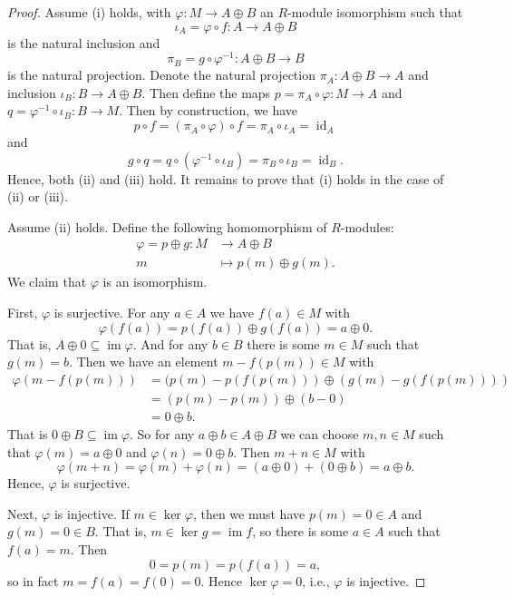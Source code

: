 \documentclass[12pt]{article}
\theoremstyle{definition}
\renewcommand{\phi}{\varphi}
\newcommand{\<}{\langle}
\renewcommand{\>}{\rangle}
\newcommand{\seq}{\subseteq}
\DeclareMathOperator{\id}{id}
\DeclareMathOperator{\im}{im}
\begin{document}
\begin{proof}
    Assume (i) holds, with $\phi : M \to A \oplus B$ an $R$-module isomorphism such that
    \[
        \iota_A = \phi \circ f: A \longrightarrow A \oplus B
    \]
    is the natural inclusion and
    \[
        \pi_B = g \circ \phi^{-1}: A \oplus B \longrightarrow B
    \]
    is the natural projection.
    Denote the natural projection $\pi_A : A \oplus B \to A$ and inclusion $\iota_B : B \to A \oplus B$.
    Then define the maps $p = \pi_A \circ \phi : M \to A$ and $q = \phi^{-1} \circ \iota_B : B \to M$.
    Then by construction, we have
    \[
        p \circ f
            = (\pi_A \circ \phi) \circ f
            = \pi_A \circ \iota_A
            = \id_A
    \]
    and
    \[
        g \circ q
            = q \circ (\phi^{-1} \circ \iota_B)
            = \pi_B \circ \iota_B
            = \id_B.
    \]
    Hence, both (ii) and (iii) hold.
    It remains to prove that (i) holds in the case of (ii) or (iii).

    Assume (ii) holds.
    Define the following homomorphism of $R$-modules:
    \begin{align*}
        \phi = p \oplus g: M &\longrightarrow A \oplus B \\
            m &\longmapsto p(m) \oplus g(m).
    \end{align*}
    We claim that $\phi$ is an isomorphism.
    
    First, $\phi$ is surjective.
    For any $a \in A$ we have $f(a) \in M$ with
    \[
        \phi(f(a)) = p(f(a)) \oplus g(f(a)) = a \oplus 0.
    \]
    That is, $A \oplus 0 \seq \im \phi$.
    And for any $b \in B$ there is some $m \in M$ such that $g(m) = b$.
    Then we have an element $m - f(p(m)) \in M$ with
    \begin{align*}
        \phi(m - f(p(m)))
            &= (p(m) - p(f(p(m))) \oplus (g(m) - g(f(p(m)))) \\
            &= (p(m) - p(m)) \oplus (b - 0) \\
            &= 0 \oplus b.
    \end{align*}
    That is $0 \oplus B \seq \im \phi$.
    So for any $a \oplus b \in A \oplus B$ we can choose $m, n \in M$ such that $\phi(m) = a \oplus 0$ and $\phi(n) = 0 \oplus b$.
    Then $m + n \in M$ with
    \[
        \phi(m + n)
            = \phi(m) + \phi(n)
            = (a \oplus 0) + (0 \oplus b)
            = a \oplus b.
    \]
    Hence, $\phi$ is surjective.

    Next, $\phi$ is injective.
    If $m \in \ker\phi$, then we must have $p(m) = 0 \in A$ and $g(m) = 0 \in B$.
    That is, $m \in \ker g = \im f$, so there is some $a \in A$ such that $f(a) = m$.
    Then
    \[
        0 = p(m) = p(f(a)) = a,
    \]
    so in fact $m = f(a) = f(0) = 0$.
    Hence $\ker \phi = 0$, i.e., $\phi$ is injective.


\end{proof}
\end{document}
